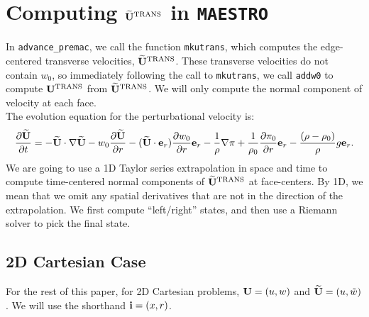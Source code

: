 \documentclass[11pt]{article}
\def\trans {\rm TRANS}
\def\eb    {{\bf e}}
\def\ib    {{\bf i}}
\def\Ub    {{\bf U}}
\def\Ubt   {\widetilde{\bf U}}
\def\wt    {\tilde{w}}
\begin{document}
\section{Computing $\Ubt^{\trans}$ in {\tt MAESTRO}}
In {\tt advance\_premac}, we call the function {\tt mkutrans}, which computes the edge-centered transverse velocities, $\Ubt^{\trans}$.  These transverse velocities do not contain $w_0$, so immediately following the call to {\tt mkutrans}, we call {\tt addw0} to compute $\Ub^{\trans}$ from $\Ubt^{\trans}$.  We will only compute the normal component of velocity at each face.\\

The evolution equation for the perturbational velocity is:
\begin{equation}
\frac{\partial\Ubt}{\partial t} = -\Ubt\cdot\nabla\Ubt - w_0\frac{\partial\Ubt}{\partial r} - (\Ubt\cdot\eb_r)\frac{\partial w_0}{\partial r}\eb_r - \frac{1}{\rho}\nabla\pi + \frac{1}{\rho_0}\frac{\partial\pi_0}{\partial r}\eb_r - \frac{(\rho-\rho_0)}{\rho}g\eb_r.\label{Perturbational Velocity Equation}
\end{equation}
We are going to use a 1D Taylor series extrapolation in space and time to compute time-centered normal components of $\Ubt^{\trans}$ at face-centers.  By 1D, we mean that we omit any spatial derivatives that are not in the direction of the extrapolation.  We first compute ``left/right'' states, and then use a Riemann solver to pick the final state.
\subsection{2D Cartesian Case}
For the rest of this paper, for 2D Cartesian problems, $\Ub = (u,w)$ and $\Ubt = (u,\wt)$.  We will use the shorthand $\ib = (x,r)$.\\
\end{document}
